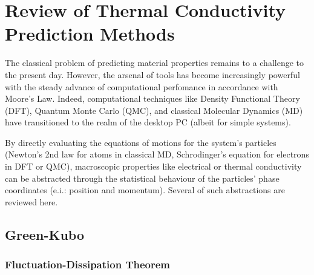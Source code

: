 \chapter{Review of Thermal Conductivity Prediction Methods}

The classical problem of predicting material properties remains to a challenge to the present day. However, the arsenal of tools has become increasingly powerful with the steady advance of computational perfomance in accordance with Moore's Law. Indeed, computational techniques like Density Functional Theory (DFT), Quantum Monte Carlo (QMC), and classical Molecular Dynamics (MD) have transitioned to the realm of the desktop PC (albeit for simple systems).

By directly evaluating the equations of motions for the system's particles (Newton's 2nd law for atoms in classical MD, Schrodinger's equation for electrons in DFT or QMC), macroscopic properties like electrical or thermal conductivity can be abstracted through the statistical behaviour of the particles' phase coordinates (e.i.: position and momentum). Several of such abstractions are reviewed here.

\section{Green-Kubo}
\subsection{Fluctuation-Dissipation Theorem}

